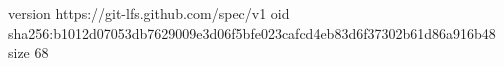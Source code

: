 version https://git-lfs.github.com/spec/v1
oid sha256:b1012d07053db7629009e3d06f5bfe023cafcd4eb83d6f37302b61d86a916b48
size 68
